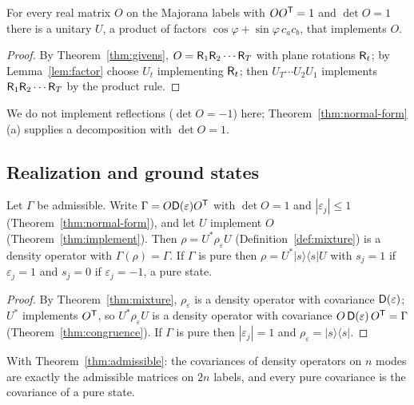 \begin{theorem}\label{thm:implement}
For every real matrix $O$ on the Majorana labels with $OO^{\mathsf T}=1$ and $\det O=1$ there is a
unitary $U$, a product of factors $\cos\varphi+\sin\varphi\,c_ac_b$, that implements $O$.
\end{theorem}
\begin{proof}
By Theorem~\ref{thm:givens}, $O=\mathsf R_1\mathsf R_2\cdots\mathsf R_T$ with plane rotations $\mathsf R_t$; by
Lemma~\ref{lem:factor} choose $U_t$ implementing $\mathsf R_t$; then $U_T\cdots U_2U_1$ implements
$\mathsf R_1\mathsf R_2\cdots\mathsf R_T$ by the product rule.
\end{proof}
\begin{remark}\label{rem:reflections}
We do not implement reflections ($\det O=-1$) here; Theorem~\ref{thm:normal-form}(a) supplies
a decomposition with $\det O=1$.
\end{remark}

\subsection{Realization and ground states}
\label{sec:realization}

\begin{theorem}\label{thm:realization}
Let $\Gamma$ be admissible. Write $\Gamma=O\mathsf D(\varepsilon)O^{\mathsf T}$ with $\det O=1$ and
$|\varepsilon_j|\leq1$ (Theorem~\ref{thm:normal-form}), and let $U$ implement $O$
(Theorem~\ref{thm:implement}). Then $\rho=U^*\rho_\varepsilon U$ (Definition~\ref{def:mixture})
is a density operator with $\Gamma(\rho)=\Gamma$. If $\Gamma$ is pure then
$\rho=U^*|s\rangle\langle s|U$ with $s_j=1$ if $\varepsilon_j=1$ and $s_j=0$ if
$\varepsilon_j=-1$, a pure state.
\end{theorem}
\begin{proof}
By Theorem~\ref{thm:mixture}, $\rho_\varepsilon$ is a density operator with covariance
$\mathsf D(\varepsilon)$; $U^*$ implements $O^{\mathsf T}$, so $U^*\rho_\varepsilon U$ is a density operator
with covariance $O\,\mathsf D(\varepsilon)\,O^{\mathsf T}=\Gamma$ (Theorem~\ref{thm:congruence}). If
$\Gamma$ is pure then $|\varepsilon_j|=1$ and $\rho_\varepsilon=|s\rangle\langle s|$.
\end{proof}
With Theorem~\ref{thm:admissible}: the covariances of density operators on $n$ modes are
exactly the admissible matrices on $2n$ labels, and every pure covariance is the covariance
of a pure state.

